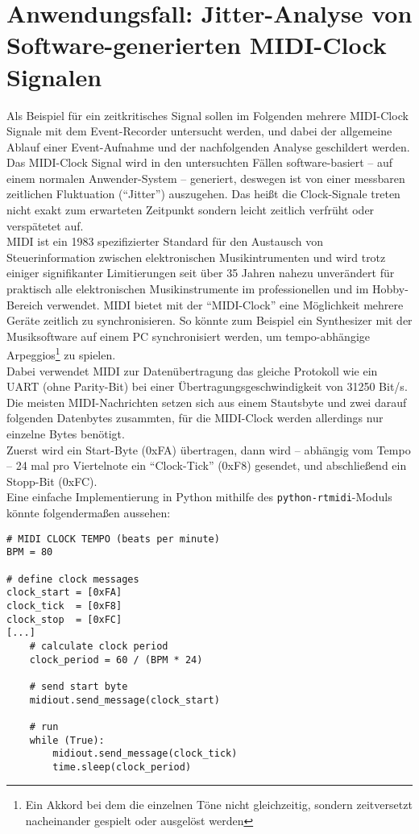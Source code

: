 \chapter{Anwendungsfall: Jitter-Analyse von Software-generierten MIDI-Clock Signalen}
\label{ch:Anwendungsfall}
Als Beispiel für ein zeitkritisches Signal sollen im Folgenden mehrere MIDI-Clock Signale mit dem Event-Recorder untersucht werden, und dabei der allgemeine Ablauf einer Event-Aufnahme und der nachfolgenden Analyse geschildert werden.
Das MIDI-Clock Signal wird in den untersuchten Fällen software-basiert -- auf einem normalen Anwender-System -- generiert, deswegen ist von einer messbaren zeitlichen Fluktuation (``Jitter'') auszugehen. Das heißt die Clock-Signale treten nicht exakt zum erwarteten Zeitpunkt sondern leicht zeitlich verfrüht oder verspätetet auf.\\
\acrshort{MIDI} ist ein 1983 spezifizierter Standard für den Austausch von Steuerinformation zwischen elektronischen Musikintrumenten und wird trotz einiger signifikanter Limitierungen seit über 35 Jahren nahezu unverändert für praktisch alle elektronischen Musikinstrumente im professionellen und im Hobby-Bereich verwendet. 
MIDI bietet mit der ``MIDI-Clock'' eine Möglichkeit mehrere Geräte zeitlich zu synchronisieren. So könnte zum Beispiel ein Synthesizer mit der Musiksoftware auf einem PC synchronisiert werden, um tempo-abhängige Arpeggios\footnote{Ein Akkord bei dem die einzelnen Töne nicht gleichzeitig, sondern zeitversetzt nacheinander gespielt oder ausgelöst werden} zu spielen.\\
Dabei verwendet MIDI zur Datenübertragung das gleiche Protokoll wie ein \acrshort{UART} (ohne Parity-Bit) bei einer Übertragungsgeschwindigkeit von 31250 Bit/s. Die meisten MIDI-Nachrichten setzen sich aus einem Stautsbyte und zwei darauf folgenden Datenbytes zusammten, für die MIDI-Clock werden allerdings nur einzelne Bytes benötigt. \\
Zuerst wird ein Start-Byte (0xFA) übertragen, dann wird -- abhängig vom Tempo -- 24 mal pro Viertelnote ein ``Clock-Tick'' (0xF8) gesendet, und abschließend ein Stopp-Bit (0xFC). \\     
\clearpage
Eine einfache Implementierung in Python mithilfe des {\tt python-rtmidi}-Moduls könnte folgendermaßen aussehen:
\begin{verbatim}
# MIDI CLOCK TEMPO (beats per minute)
BPM = 80

# define clock messages
clock_start = [0xFA]
clock_tick  = [0xF8]
clock_stop  = [0xFC]
[...]
    # calculate clock period
    clock_period = 60 / (BPM * 24)

    # send start byte 
    midiout.send_message(clock_start)

    # run
    while (True):
        midiout.send_message(clock_tick)
        time.sleep(clock_period)

\end{verbatim}


